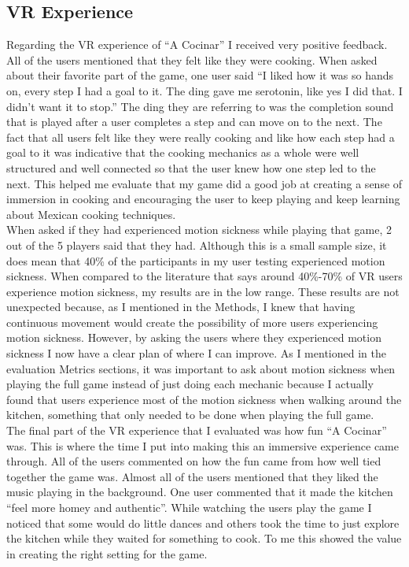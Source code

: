\documentclass[10pt,twocolumn]{article}
\begin{document}
\subsection{VR Experience}
Regarding the VR experience of “A Cocinar” I received very positive feedback. All of the users mentioned that they felt like they were cooking. When asked about their favorite part of the game, one user said “I liked how it was so hands on, every step I had a goal to it. The ding gave me serotonin, like yes I did that. I didn’t want it to stop.” The ding they are referring to was the completion sound that is played after a user completes a step and can move on to the next. The fact that all users felt like they were really cooking and like how each step had a goal to it was indicative that the cooking mechanics as a whole were well structured and well connected so that the user knew how one step led to the next. This helped me evaluate that my game did a good job at creating a sense of immersion in cooking and encouraging the user to keep playing and keep learning about Mexican cooking techniques. 
\\
When asked if they had experienced motion sickness while playing that game, 2 out of the 5 players said that they had. Although this is a small sample size, it does mean that 40\% of the participants in my user testing experienced motion sickness. When compared to the literature that says around 40\%-70\% of VR users experience motion sickness, my results are in the low range\cite{motionsicknessvr2019}. These results are not unexpected because, as I mentioned in the Methods, I knew that having continuous movement would create the possibility of more users experiencing motion sickness. However, by asking the users where they experienced motion sickness I now have a clear plan of where I can improve. As I mentioned in the evaluation Metrics sections, it was important to ask about motion sickness when playing the full game instead of just doing each mechanic because I actually found that users experience most of the motion sickness when walking around the kitchen, something that only needed to be done when playing the full game. 
 \\
The final part of the VR experience that I evaluated was how fun “A Cocinar” was. This is where the time I put into making this an immersive experience came through. All of the users commented on how the fun came from how well tied together the game was. Almost all of the users mentioned that they liked the music playing in the background. One user commented that it made the kitchen “feel more homey and authentic”. While watching the users play the game I noticed that some would do little dances and others took the time to just explore the kitchen while they waited for something to cook. To me this showed the value in creating the right setting for the game.
\end{document}
